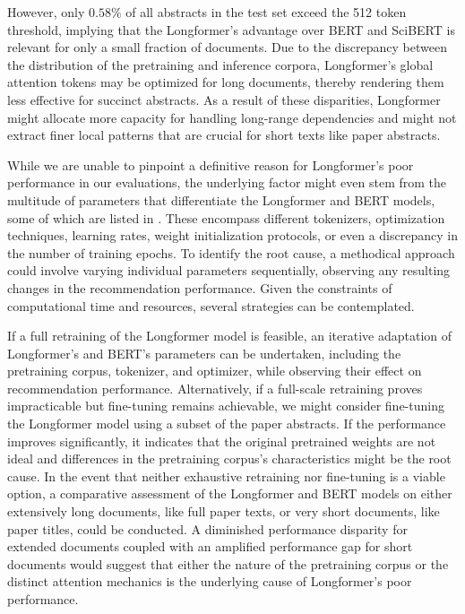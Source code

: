 However, only $0.58\%$ of all abstracts in the test set exceed the 512 token threshold, implying that the Longformer's advantage over BERT and SciBERT is relevant for only a small fraction of documents.
Due to the discrepancy between the distribution of the pretraining and inference corpora, Longformer's global attention tokens may be optimized for long documents, thereby rendering them less effective for succinct abstracts.
As a result of these disparities, Longformer might allocate more capacity for handling long-range dependencies and might not extract finer local patterns that are crucial for short texts like paper abstracts.

While we are unable to pinpoint a definitive reason for Longformer's poor performance in our evaluations, the underlying factor might even stem from the multitude of parameters that differentiate the Longformer and BERT models, some of which are listed in .
These encompass different tokenizers, optimization techniques, learning rates, weight initialization protocols, or even a discrepancy in the number of training epochs.
To identify the root cause, a methodical approach could involve varying individual parameters sequentially, observing any resulting changes in the recommendation performance.
Given the constraints of computational time and resources, several strategies can be contemplated.

If a full retraining of the Longformer model is feasible, an iterative adaptation of Longformer's and BERT's parameters can be undertaken, including the pretraining corpus, tokenizer, and optimizer, while observing their effect on recommendation performance.
Alternatively, if a full-scale retraining proves impracticable but fine-tuning remains achievable, we might consider fine-tuning the Longformer model using a subset of the paper abstracts. If the performance improves significantly, it indicates that the original pretrained weights are not ideal and differences in the pretraining corpus's characteristics might be the root cause.
In the event that neither exhaustive retraining nor fine-tuning is a viable option, a comparative assessment of the Longformer and BERT models on either extensively long documents, like full paper texts, or very short documents, like paper titles, could be conducted.
A diminished performance disparity for extended documents coupled with an amplified performance gap for short documents would suggest that either the nature of the pretraining corpus or the distinct attention mechanics is the underlying cause of Longformer's poor performance.


